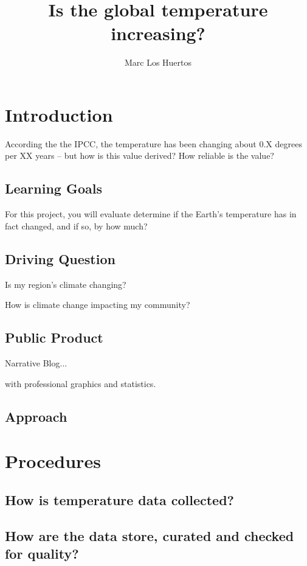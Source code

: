 \documentclass{article}\usepackage[]{graphicx}\usepackage[]{color}
\title{Is the global temperature increasing?}
\author{Marc Los Huertos}
\date{}
\begin{document}
\maketitle

\section{Introduction}

According the the IPCC, the temperature has been changing about 0.X degrees per XX years -- but how is this value derived? How reliable is the value?  

\subsection{Learning Goals}

For this project, you will evaluate determine if the Earth's temperature has in fact changed, and if so, by how much?

\subsection{Driving Question}

Is my region's climate changing?

How is climate change impacting my community?

\subsection{Public Product}

Narrative Blog...

with professional graphics and statistics.

\subsection{Approach}


\section{Procedures}

\subsection{How is temperature data collected?}

\subsection{How are the data store, curated and checked for quality?}
\end{document}
